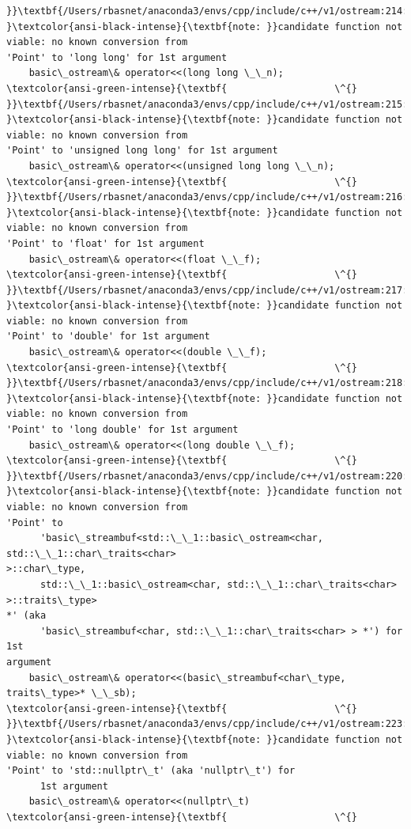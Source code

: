 \documentclass[11pt]{article}
\begin{document}
\begin{Verbatim}[commandchars=\\\{\}]
}}\textbf{/Users/rbasnet/anaconda3/envs/cpp/include/c++/v1/ostream:214:20:
}\textcolor{ansi-black-intense}{\textbf{note: }}candidate function not viable: no known conversion from
'Point' to 'long long' for 1st argument
    basic\_ostream\& operator<<(long long \_\_n);
\textcolor{ansi-green-intense}{\textbf{                   \^{}
}}\textbf{/Users/rbasnet/anaconda3/envs/cpp/include/c++/v1/ostream:215:20:
}\textcolor{ansi-black-intense}{\textbf{note: }}candidate function not viable: no known conversion from
'Point' to 'unsigned long long' for 1st argument
    basic\_ostream\& operator<<(unsigned long long \_\_n);
\textcolor{ansi-green-intense}{\textbf{                   \^{}
}}\textbf{/Users/rbasnet/anaconda3/envs/cpp/include/c++/v1/ostream:216:20:
}\textcolor{ansi-black-intense}{\textbf{note: }}candidate function not viable: no known conversion from
'Point' to 'float' for 1st argument
    basic\_ostream\& operator<<(float \_\_f);
\textcolor{ansi-green-intense}{\textbf{                   \^{}
}}\textbf{/Users/rbasnet/anaconda3/envs/cpp/include/c++/v1/ostream:217:20:
}\textcolor{ansi-black-intense}{\textbf{note: }}candidate function not viable: no known conversion from
'Point' to 'double' for 1st argument
    basic\_ostream\& operator<<(double \_\_f);
\textcolor{ansi-green-intense}{\textbf{                   \^{}
}}\textbf{/Users/rbasnet/anaconda3/envs/cpp/include/c++/v1/ostream:218:20:
}\textcolor{ansi-black-intense}{\textbf{note: }}candidate function not viable: no known conversion from
'Point' to 'long double' for 1st argument
    basic\_ostream\& operator<<(long double \_\_f);
\textcolor{ansi-green-intense}{\textbf{                   \^{}
}}\textbf{/Users/rbasnet/anaconda3/envs/cpp/include/c++/v1/ostream:220:20:
}\textcolor{ansi-black-intense}{\textbf{note: }}candidate function not viable: no known conversion from
'Point' to
      'basic\_streambuf<std::\_\_1::basic\_ostream<char, std::\_\_1::char\_traits<char>
>::char\_type,
      std::\_\_1::basic\_ostream<char, std::\_\_1::char\_traits<char> >::traits\_type>
*' (aka
      'basic\_streambuf<char, std::\_\_1::char\_traits<char> > *') for 1st
argument
    basic\_ostream\& operator<<(basic\_streambuf<char\_type, traits\_type>* \_\_sb);
\textcolor{ansi-green-intense}{\textbf{                   \^{}
}}\textbf{/Users/rbasnet/anaconda3/envs/cpp/include/c++/v1/ostream:223:20:
}\textcolor{ansi-black-intense}{\textbf{note: }}candidate function not viable: no known conversion from
'Point' to 'std::nullptr\_t' (aka 'nullptr\_t') for
      1st argument
    basic\_ostream\& operator<<(nullptr\_t)
\textcolor{ansi-green-intense}{\textbf{                   \^{}

\end{Verbatim}
\end{document}
